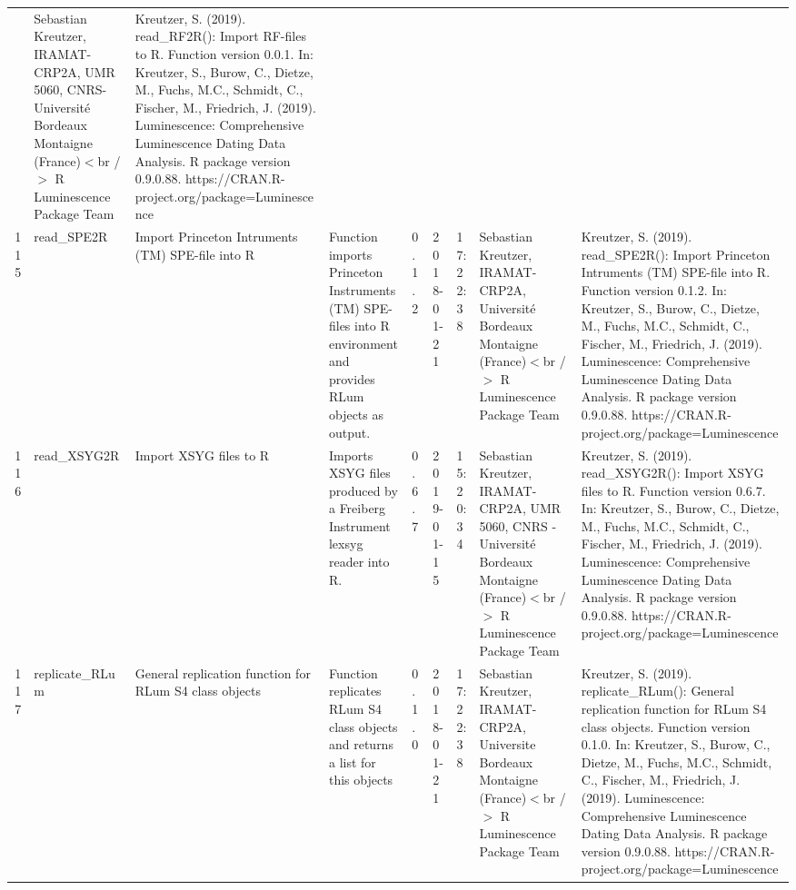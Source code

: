 \begin{table}[ht]
\begin{tabular}{rllllllll}
 & Sebastian Kreutzer, IRAMAT-CRP2A, UMR 5060, CNRS-Université Bordeaux Montaigne (France)$<$br /$>$  R Luminescence Package Team & Kreutzer, S. (2019). read\_RF2R(): Import RF-files to R. Function version 0.0.1. In: Kreutzer, S., Burow, C., Dietze, M., Fuchs, M.C., Schmidt, C., Fischer, M., Friedrich, J. (2019). Luminescence: Comprehensive Luminescence Dating Data Analysis. R package version 0.9.0.88. https://CRAN.R-project.org/package=Luminescence
 \\ 
  115 & read\_SPE2R & Import Princeton Intruments (TM) SPE-file into R & Function imports Princeton Instruments (TM) SPE-files into R environment and provides  RLum  objects as output. & 0.1.2 & 2018-01-21 & 17:22:38
 & Sebastian Kreutzer, IRAMAT-CRP2A, Université Bordeaux Montaigne (France)$<$br /$>$  R Luminescence Package Team & Kreutzer, S. (2019). read\_SPE2R(): Import Princeton Intruments (TM) SPE-file into R. Function version 0.1.2. In: Kreutzer, S., Burow, C., Dietze, M., Fuchs, M.C., Schmidt, C., Fischer, M., Friedrich, J. (2019). Luminescence: Comprehensive Luminescence Dating Data Analysis. R package version 0.9.0.88. https://CRAN.R-project.org/package=Luminescence
 \\ 
  116 & read\_XSYG2R & Import XSYG files to R & Imports XSYG files produced by a Freiberg Instrument lexsyg reader into R. & 0.6.7 & 2019-01-15 & 15:20:34
 & Sebastian Kreutzer, IRAMAT-CRP2A, UMR 5060, CNRS - Université Bordeaux Montaigne (France)$<$br /$>$  R Luminescence Package Team & Kreutzer, S. (2019). read\_XSYG2R(): Import XSYG files to R. Function version 0.6.7. In: Kreutzer, S., Burow, C., Dietze, M., Fuchs, M.C., Schmidt, C., Fischer, M., Friedrich, J. (2019). Luminescence: Comprehensive Luminescence Dating Data Analysis. R package version 0.9.0.88. https://CRAN.R-project.org/package=Luminescence
 \\ 
  117 & replicate\_RLum & General replication function for RLum S4 class objects & Function replicates RLum S4 class objects and returns a list for this objects & 0.1.0 & 2018-01-21 & 17:22:38
 & Sebastian Kreutzer, IRAMAT-CRP2A, Universite Bordeaux Montaigne (France)$<$br /$>$  R Luminescence Package Team & Kreutzer, S. (2019). replicate\_RLum(): General replication function for RLum S4 class objects. Function version 0.1.0. In: Kreutzer, S., Burow, C., Dietze, M., Fuchs, M.C., Schmidt, C., Fischer, M., Friedrich, J. (2019). Luminescence: Comprehensive Luminescence Dating Data Analysis. R package version 0.9.0.88. https://CRAN.R-project.org/package=Luminescence
 \\ 

\end{tabular}
\end{table}
